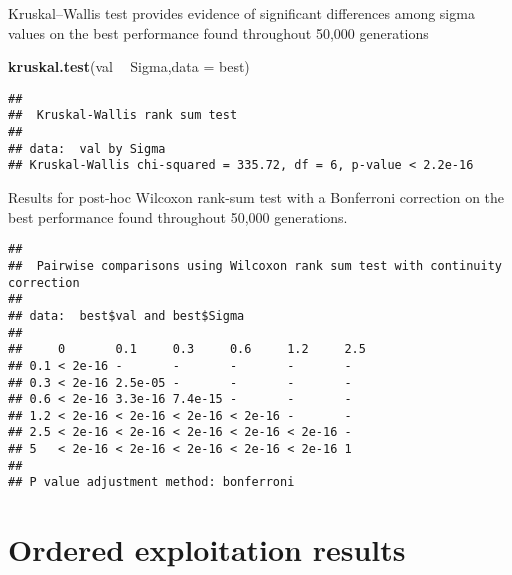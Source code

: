 \documentclass[]{book}
\newenvironment{Shaded}{\begin{snugshade}}{\end{snugshade}}
\newcommand{\DataTypeTok}[1]{\textcolor[rgb]{0.13,0.29,0.53}{#1}}
\newcommand{\KeywordTok}[1]{\textcolor[rgb]{0.13,0.29,0.53}{\textbf{#1}}}
\newcommand{\NormalTok}[1]{#1}
\newcommand{\OperatorTok}[1]{\textcolor[rgb]{0.81,0.36,0.00}{\textbf{#1}}}
\newcommand{\OtherTok}[1]{\textcolor[rgb]{0.56,0.35,0.01}{#1}}
\newcommand{\StringTok}[1]{\textcolor[rgb]{0.31,0.60,0.02}{#1}}
\begin{document}
Kruskal--Wallis test provides evidence of significant differences among sigma values on the best performance found throughout 50,000 generations

\begin{Shaded}
\begin{Highlighting}[]
\KeywordTok{kruskal.test}\NormalTok{(val }\OperatorTok{~}\StringTok{ }\NormalTok{Sigma,}\DataTypeTok{data =}\NormalTok{ best)}
\end{Highlighting}
\end{Shaded}

\begin{verbatim}
## 
##  Kruskal-Wallis rank sum test
## 
## data:  val by Sigma
## Kruskal-Wallis chi-squared = 335.72, df = 6, p-value < 2.2e-16
\end{verbatim}

Results for post-hoc Wilcoxon rank-sum test with a Bonferroni correction on the best performance found throughout 50,000 generations.

\begin{Shaded}
\end{Shaded}

\begin{verbatim}
## 
##  Pairwise comparisons using Wilcoxon rank sum test with continuity correction 
## 
## data:  best$val and best$Sigma 
## 
##     0       0.1     0.3     0.6     1.2     2.5
## 0.1 < 2e-16 -       -       -       -       -  
## 0.3 < 2e-16 2.5e-05 -       -       -       -  
## 0.6 < 2e-16 3.3e-16 7.4e-15 -       -       -  
## 1.2 < 2e-16 < 2e-16 < 2e-16 < 2e-16 -       -  
## 2.5 < 2e-16 < 2e-16 < 2e-16 < 2e-16 < 2e-16 -  
## 5   < 2e-16 < 2e-16 < 2e-16 < 2e-16 < 2e-16 1  
## 
## P value adjustment method: bonferroni
\end{verbatim}

\hypertarget{ordered-exploitation-results-4}{%
\section{Ordered exploitation results}\label{ordered-exploitation-results-4}}
\end{document}
